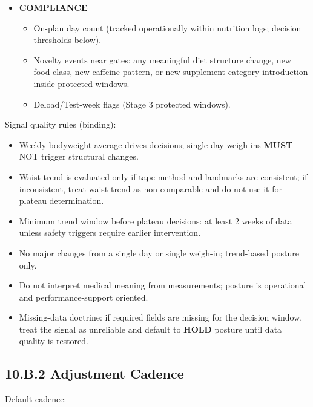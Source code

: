 \documentclass[10pt]{article}
\begin{document}
\begin{itemize}
\begin{itemize}
\item Illness flags and systemic symptom notes (non-diagnostic).
\end{itemize}
\item \textbf{COMPLIANCE}
\begin{itemize}
\item On-plan day count (tracked operationally within nutrition logs; decision thresholds below).
\item Novelty events near gates: any meaningful diet structure change, new food class, new caffeine pattern, or new supplement category introduction inside protected windows.
\item Deload/Test-week flags (Stage 3 protected windows).
\end{itemize}
\end{itemize}

Signal quality rules (binding):

\begin{itemize}
\item Weekly bodyweight average drives decisions; single-day weigh-ins \textbf{MUST} NOT trigger structural changes.
\item Waist trend is evaluated only if tape method and landmarks are consistent; if inconsistent, treat waist trend as non-comparable and do not use it for plateau determination.
\item Minimum trend window before plateau decisions: at least 2 weeks of data unless safety triggers require earlier intervention.
\item No major changes from a single day or single weigh-in; trend-based posture only.
\item Do not interpret medical meaning from measurements; posture is operational and performance-support oriented.
\item Missing-data doctrine: if required fields are missing for the decision window, treat the signal as unreliable and default to \textbf{HOLD} posture until data quality is restored.
\end{itemize}

\newpage
\subsection*{10.B.2 Adjustment Cadence}
{}

Default cadence:
\end{document}

